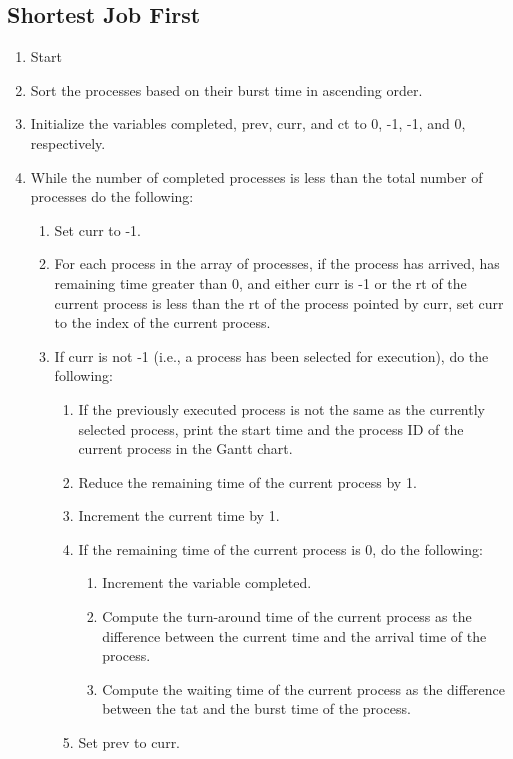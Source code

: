 \subsection{Shortest Job First}
\begin{enumerate}
   \item Start
   \item Sort the processes based on their burst time in ascending order.
   \item Initialize the variables completed, prev, curr, and ct to 0, -1, -1, and 0, respectively.
   \item While the number of completed processes is less than the total number of processes do the following:
   \begin{enumerate}
       \item Set curr to -1.
       \item For each process in the array of processes, if the process has arrived, has remaining time greater than 0, and either curr is -1 or the rt of the current process is less than the rt of the process pointed by curr, set curr to the index of the current process.
       \item If curr is not -1 (i.e., a process has been selected for execution), do the following:
       \begin{enumerate}
           \item If the previously executed process is not the same as the currently selected process, print the start time and the process ID of the current process in the Gantt chart.
           \item Reduce the remaining time of the current process by 1.
           \item Increment the current time by 1.
           \item If the remaining time of the current process is 0, do the following:
           \begin{enumerate}
               \item Increment the variable completed.
               \item Compute the turn-around time of the current process as the difference between the current time and the arrival time of the process.
               \item Compute the waiting time of the current process as the difference between the tat and the burst time of the process.
           \end{enumerate}
           \item Set prev to curr.
       \end{enumerate}

\end{enumerate}
\end{enumerate}
